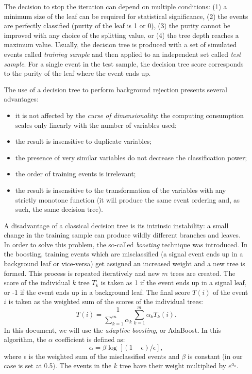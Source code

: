 The decision to stop the iteration can depend on multiple conditions: (1) a minimum size of the leaf can be required for statistical significance, (2) the events are perfectly classified (purity of the leaf is 1 or 0), (3) the purity cannot be improved with any choice of the splitting value, or (4) the tree depth reaches a maximum value. 
Usually, the decision tree is produced with a set of simulated events called \emph{training sample} and then applied to an independent set called \emph{test sample}.
For a single event in the test sample, the decision tree score corresponds to the purity of the leaf where the event ends up. 

The use of a decision tree to perform background rejection presents several advantages: 
\begin{itemize}
    \item it is not affected by the \emph{curse of dimensionality}: the computing consumption scales only linearly with the number of variables used;
    \item the result is insensitive to duplicate variables;
    \item the presence of very similar variables do not decrease the classification power;
    \item the order of training events is irrelevant;
    \item the result is insensitive to the transformation of the variables with any strictly monotone function (it will produce the same event ordering and, as such, the same decision tree).
\end{itemize}

A disadvantage of a classical decision tree is its intrinsic instability: a small change in the training sample can produce wildly different branches and leaves. In order to solve this problem, the so-called \emph{boosting} technique was introduced. In the boosting, training events which are misclassified (a signal event ends up in a background leaf or vice-versa) get assigned an increased weight and a new tree is formed. This process is repeated iteratively and new $m$ trees are created. The score of the individual $k$ tree $T_k$ is taken as 1 if the event ends up in a signal leaf, or -1 if the event ends up in a background leaf.  The final score $T(i)$ of the event $i$ is taken as the weighted sum of the scores of the individual trees:
\begin{equation}
    T(i) = \frac{1}{\sum^m_{k=1} \alpha_k} \sum^m_{k=1}\alpha_k T_k(i).
\end{equation}
In this document, we will use the \emph{adaptive boosting}, or AdaBoost. In this algorithm, the $\alpha$ coefficient is defined as:
\begin{equation}
    \alpha = \beta \log[(1-\epsilon)/\epsilon],
\end{equation}
where $\epsilon$ is the weighted sum of the misclassified events and $\beta$ is constant (in our case is set at 0.5). The events in the $k$ tree have their weight multiplied by $e^{a_k}$.

